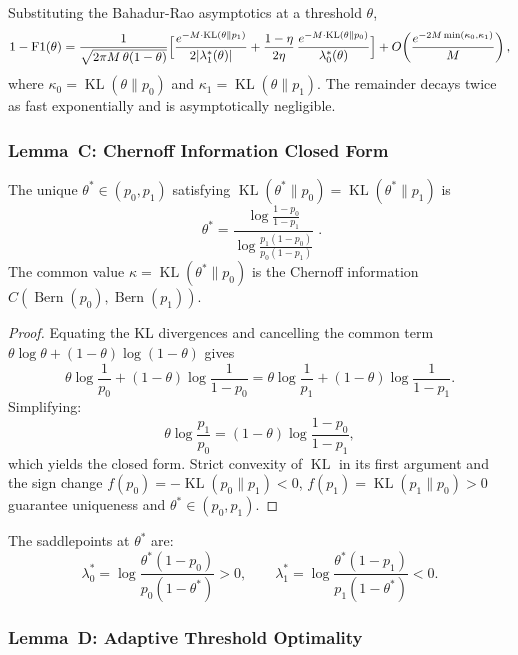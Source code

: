 Substituting the Bahadur-Rao asymptotics at a threshold $\theta$,
\[
1-\operatorname{F1}(\theta)
= \frac1{\sqrt{2\pi M\,\theta(1-\theta)}}
  \Bigl[
    \frac{e^{-M\cdot\operatorname{KL}(\theta\|p_1)}}{2|\lambda_1^*(\theta)|}
    + \frac{1-\eta}{2\eta}\,
      \frac{e^{-M\cdot\operatorname{KL}(\theta\|p_0)}}{\lambda_0^*(\theta)}
  \Bigr]
  + O\!\left(\frac{e^{-2M\min(\kappa_0,\kappa_1)}}{M}\right),
\]
where $\kappa_0=\operatorname{KL}(\theta\|p_0)$ and
$\kappa_1=\operatorname{KL}(\theta\|p_1)$.  The remainder decays twice as
fast exponentially and is asymptotically negligible.

\subsubsection{Lemma~C: Chernoff Information Closed Form}
\label{sec:lemmaC}

\begin{lemma}
  \label{lem:Chernoff}
  The unique $\theta^*\in(p_0,p_1)$ satisfying
  $\operatorname{KL}(\theta^*\|p_0)=\operatorname{KL}(\theta^*\|p_1)$ is
  \[
  \boxed{\;
  \theta^*
  = \frac{\log\frac{1-p_0}{1-p_1}}
         {\log\frac{p_1(1-p_0)}{p_0(1-p_1)}}\;}.
  \]
  The common value $\kappa=\operatorname{KL}(\theta^*\|p_0)$ is the
  Chernoff information $C(\operatorname{Bern}(p_0),\operatorname{Bern}(p_1))$.
\end{lemma}

\begin{proof}
  Equating the KL divergences and cancelling the common term
  $\theta\log\theta+(1-\theta)\log(1-\theta)$ gives
  \[
  \theta\log\frac1{p_0}+(1-\theta)\log\frac1{1-p_0}
  = \theta\log\frac1{p_1}+(1-\theta)\log\frac1{1-p_1}.
  \]
  Simplifying:
  \[
  \theta\log\frac{p_1}{p_0} = (1-\theta)\log\frac{1-p_0}{1-p_1},
  \]
  which yields the closed form.  Strict convexity of $\operatorname{KL}$
  in its first argument and the sign change
  $f(p_0)=-\operatorname{KL}(p_0\|p_1)<0$,
  $f(p_1)=\operatorname{KL}(p_1\|p_0)>0$ guarantee uniqueness and
  $\theta^*\in(p_0,p_1)$.
\end{proof}

The saddlepoints at $\theta^*$ are:
\[
\lambda_0^* = \log\frac{\theta^*(1-p_0)}{p_0(1-\theta^*)}>0,\qquad
\lambda_1^* = \log\frac{\theta^*(1-p_1)}{p_1(1-\theta^*)}<0.
\]

\subsubsection{Lemma~D: Adaptive Threshold Optimality}
\label{sec:lemmaD}

